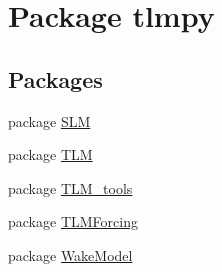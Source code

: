\hypertarget{namespacetlmpy}{
\section{Package tlmpy}
\label{namespacetlmpy}
}
\subsection*{Packages}
\begin{DoxyCompactItemize}
\item 
package \hyperlink{namespacetlmpy_1_1SLM}{SLM}
\item 
package \hyperlink{namespacetlmpy_1_1TLM}{TLM}
\item 
package \hyperlink{namespacetlmpy_1_1TLM__tools}{TLM\_\-tools}
\item 
package \hyperlink{namespacetlmpy_1_1TLMForcing}{TLMForcing}
\item 
package \hyperlink{namespacetlmpy_1_1WakeModel}{WakeModel}
\end{DoxyCompactItemize}

